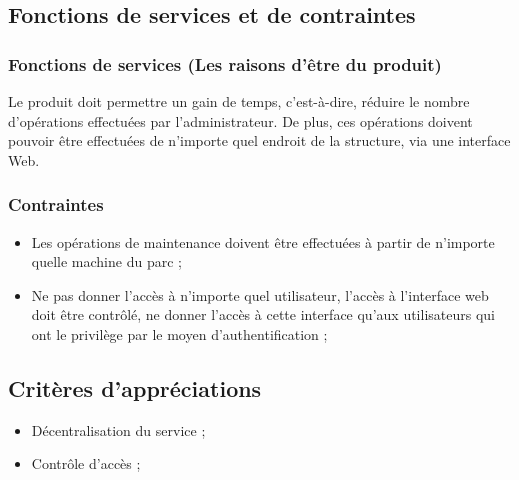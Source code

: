 \documentclass[11pt]{article}
\begin{document}
\subsection{Fonctions de services et de contraintes}
  \subsubsection{Fonctions de services (Les raisons d'être du produit)}
  Le produit doit permettre un gain de temps, c’est-à-dire, réduire le nombre d'opérations effectuées par l'administrateur. De plus, ces opérations doivent pouvoir être effectuées de n'importe quel endroit de la structure, via une interface Web.
  \subsubsection{Contraintes}     
  \begin{itemize}
     \item Les opérations de maintenance doivent être effectuées à partir de n'importe quelle machine du parc ;
     \item Ne pas donner l'accès à n'importe quel utilisateur, l'accès à l'interface web doit être contrôlé, ne donner l'accès à cette interface qu'aux utilisateurs qui ont le privilège par le moyen d'authentification ;
  \end{itemize}    
\subsection{Critères d'appréciations}  

  \begin{itemize}
     \item Décentralisation du service ;
     \item Contrôle d'accès ;
  \end{itemize}
\end{document}
